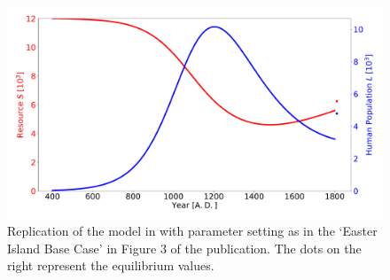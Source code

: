 \begin{figure}
	\centering
	\includegraphics[width=1 \textwidth]{images/Brander1998_EIBaseCase}
	\caption{Replication of the model in \citet{Brander1998} with parameter setting as in the `Easter Island Base Case' in Figure 3 of the publication. The dots on the right represent the equilibrium values.}
	\label{fig:brander1998eibasecase}
\end{figure}

